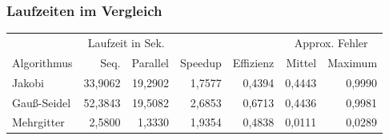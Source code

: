 \documentclass{beamer}
\begin{document}
\begin{frame}
    \frametitle{Laufzeiten im Vergleich}
    \footnotesize
    \begin{tabular}{|l|r|r|r|r|r|r|} \hline
    & \multicolumn{2}{c|}{Laufzeit in Sek.} & & & \multicolumn{2}{c|}{Approx. Fehler} \\
    Algorithmus & Seq.    & Parallel & Speedup & Effizienz & Mittel   & Maximum \\ \hline \hline
    Jakobi      & 33,9062 & 19,2902  & 1,7577  & 0,4394    & 0,4443   & 0,9990  \\
    Gauß-Seidel & 52,3843 & 19,5082  & 2,6853  & 0,6713    & 0,4436   & 0,9981  \\
    Mehrgitter  & 2,5800  & 1,3330   & 1,9354  & 0,4838    & 0,0111   & 0,0289  \\ \hline
    \end{tabular}
\end{frame}
\end{document}
